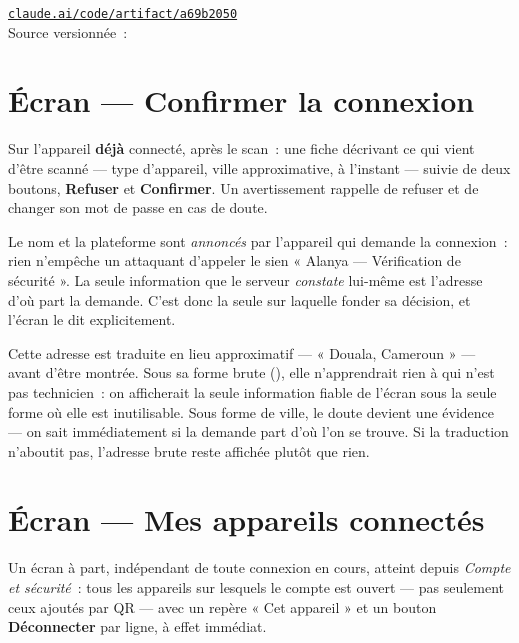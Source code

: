\begin{note}
\href{https://claude.ai/code/artifact/a69b2050-b2dc-4aa1-a204-59ada2526a86}%
{\texttt{claude.ai/code/artifact/a69b2050}}\\
Source versionnée~: 
\end{note}

\section{Écran --- Confirmer la connexion}

Sur l'appareil \textbf{déjà} connecté, après le scan~: une fiche décrivant ce qui vient
d'être scanné --- type d'appareil, ville approximative, à l'instant --- suivie de deux
boutons, \textbf{Refuser} et \textbf{Confirmer}. Un avertissement rappelle de refuser et de
changer son mot de passe en cas de doute.

\begin{note}
Le nom et la plateforme sont \emph{annoncés} par l'appareil qui demande la connexion~: rien
n'empêche un attaquant d'appeler le sien « Alanya --- Vérification de sécurité ». La seule
information que le serveur \emph{constate} lui-même est l'adresse d'où part la demande.
C'est donc la seule sur laquelle fonder sa décision, et l'écran le dit explicitement.
\end{note}

\begin{note}
Cette adresse est traduite en lieu approximatif --- « Douala, Cameroun » --- avant d'être
montrée. Sous sa forme brute (), elle n'apprendrait rien à qui n'est pas
technicien~: on afficherait la seule information fiable de l'écran sous la seule forme où
elle est inutilisable. Sous forme de ville, le doute devient une évidence --- on sait
immédiatement si la demande part d'où l'on se trouve. Si la traduction n'aboutit pas,
l'adresse brute reste affichée plutôt que rien.
\end{note}

\section{Écran --- Mes appareils connectés}

Un écran à part, indépendant de toute connexion en cours, atteint depuis \emph{Compte et
sécurité}~: tous les appareils sur lesquels le compte est ouvert --- pas seulement ceux
ajoutés par QR --- avec un repère « Cet appareil » et un bouton \textbf{Déconnecter} par
ligne, à effet immédiat.


